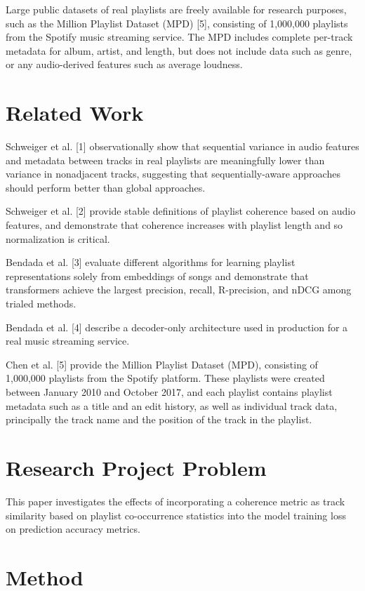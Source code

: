 \documentclass[conference]{IEEEtran}
\begin{document}
Large public datasets of real playlists are freely available for research purposes, such as the Million Playlist Dataset (MPD) [5], consisting of 1,000,000 playlists from the Spotify music streaming service. The MPD includes complete per-track metadata for album, artist, and length, but does not include data such as genre, or any audio-derived features such as average loudness.

\section{Related Work}

Schweiger et al. [1] observationally show that sequential variance in audio features and metadata between tracks in real playlists are meaningfully lower than variance in nonadjacent tracks, suggesting that sequentially-aware approaches should perform better than global approaches.

Schweiger et al. [2] provide stable definitions of playlist coherence based on audio features, and demonstrate that coherence increases with playlist length and so normalization is critical.

Bendada et al. [3] evaluate different algorithms for learning playlist representations solely from embeddings of songs and demonstrate that transformers achieve the largest precision, recall, R-precision, and nDCG among trialed methods.

Bendada et al. [4] describe a decoder-only architecture used in production for a real music streaming service.

Chen et al. [5] provide the Million Playlist Dataset (MPD), consisting of 1,000,000 playlists from the Spotify platform. These playlists were created between January 2010 and October 2017, and each playlist contains playlist metadata such as a title and an edit history, as well as individual track data, principally the track name and the position of the track in the playlist.

\section{Research Project Problem}

This paper investigates the effects of incorporating a coherence metric as track similarity based on playlist co-occurrence statistics into the model training loss on prediction accuracy metrics.

\section{Method}
\end{document}
